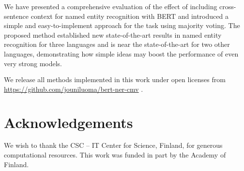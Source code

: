\documentclass[11pt]{article}
\begin{document}
We have presented a comprehensive evaluation of the effect of including cross-sentence context for named entity recognition with BERT and introduced a simple and easy-to-implement approach for the task using majority voting. The proposed method established new state-of-the-art results in named entity recognition for three languages and is near the state-of-the-art for two other languages, demonstrating how simple ideas may boost the performance of even very strong models.

We release all methods implemented in this work under open licenses from \url{https://github.com/jouniluoma/bert-ner-cmv} .

\section*{Acknowledgements}

We wish to thank the CSC -- IT Center for Science, Finland, for generous computational resources. This work was funded in part by the Academy of Finland.



\end{document}
